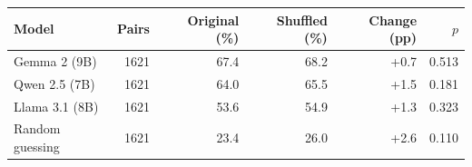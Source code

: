 \begin{tabular}{@{}lrrrrr@{}}
\toprule
Model & Pairs & Original (\%) & Shuffled (\%) & Change (pp) & $p$ \\
\midrule
Gemma 2 (9B) & 1621 & 67.4 & 68.2 & +0.7 & 0.513 \\
Qwen 2.5 (7B) & 1621 & 64.0 & 65.5 & +1.5 & 0.181 \\
Llama 3.1 (8B) & 1621 & 53.6 & 54.9 & +1.3 & 0.323 \\
Random guessing & 1621 & 23.4 & 26.0 & +2.6 & 0.110 \\
\bottomrule
\end{tabular}

